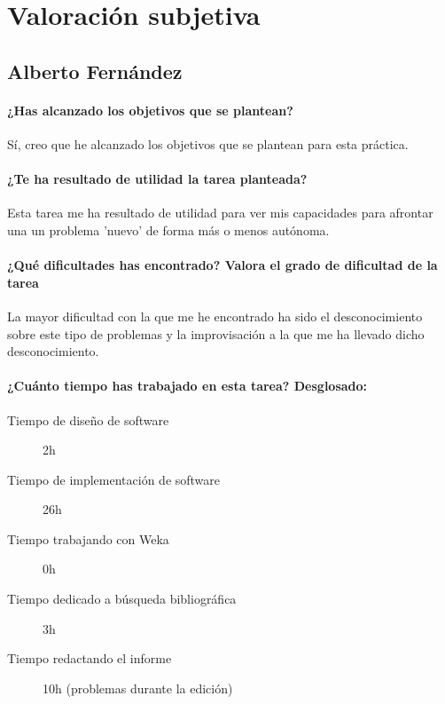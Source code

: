 \documentclass[11pt, titlepage,a4paper]{article}
\begin{document}
\section{Valoración subjetiva}

\subsection{Alberto Fernández}
\paragraph{¿Has alcanzado los objetivos que se plantean?\\}
Sí, creo que he alcanzado los objetivos que se plantean para esta práctica.

\paragraph{¿Te ha resultado de utilidad la tarea planteada?\\}
Esta tarea me ha resultado de utilidad para ver mis capacidades para afrontar
una un problema 'nuevo' de forma más o menos autónoma.

\paragraph{¿Qué dificultades has encontrado? Valora el grado de dificultad de
la tarea\\}
La mayor dificultad con la que me he encontrado ha sido el desconocimiento sobre
este tipo de problemas y la improvisación a la que me ha llevado dicho desconocimiento.

\paragraph{¿Cuánto tiempo has trabajado en esta tarea? Desglosado:\\}
\begin{description}
	\item[Tiempo de diseño de software] 2h
	\item[Tiempo de implementación de software] 26h
	\item[Tiempo trabajando con Weka] 0h
	\item[Tiempo dedicado a búsqueda bibliográfica] 3h
	\item[Tiempo redactando el informe] 10h (problemas durante la edición)
\end{description}
\end{document}
